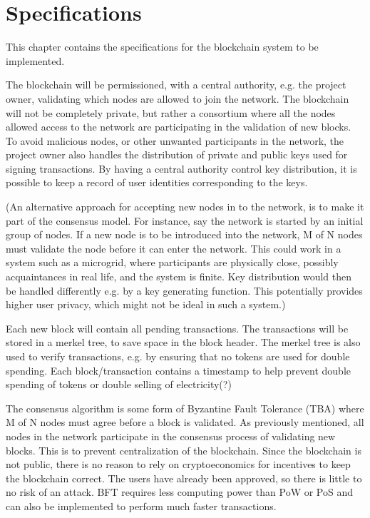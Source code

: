 \chapter{Specifications}
This chapter contains the specifications for the blockchain system to be implemented. 

The blockchain will be permissioned, with a central authority, e.g. the project owner, validating which nodes are allowed to join the network. The blockchain will not be completely private, but rather a consortium where all the nodes allowed access to the network are participating in the validation of new blocks. To avoid malicious nodes, or other unwanted participants in the network, the project owner also handles the distribution of private and public keys used for signing transactions. By having a central authority control key distribution, it is possible to keep a record of user identities corresponding to the keys. 

(An alternative approach for accepting new nodes in to the network, is to make it part of the consensus model. For instance, say the network is started by an initial group of nodes. If a new node is to be introduced into the network, M of N nodes must validate the node before it can enter the network. This could work in a system such as a microgrid, where participants are physically close, possibly acquaintances in real life, and the system is finite. Key distribution would then be handled differently e.g. by a key generating function. This potentially provides higher user privacy, which might not be ideal in such a system.)

Each new block will contain all pending transactions. The transactions will be stored in a merkel tree, to save space in the block header. The merkel tree is also used to verify transactions, e.g. by ensuring that no tokens are used for double spending. %
Each block/transaction contains a timestamp to help prevent double spending of tokens or double selling of electricity(?)%

The consensus algorithm is some form of Byzantine Fault Tolerance (TBA) where M of N nodes must agree before a block is validated. As previously mentioned, all nodes in the network participate in the consensus process of validating new blocks. This is to prevent centralization of the blockchain. Since the blockchain is not public, there is no reason to rely on cryptoeconomics for incentives to keep the blockchain correct. The users have already been approved, so there is little to no risk of an attack. BFT requires less computing power than PoW or PoS and can also be implemented to perform much faster transactions. %

